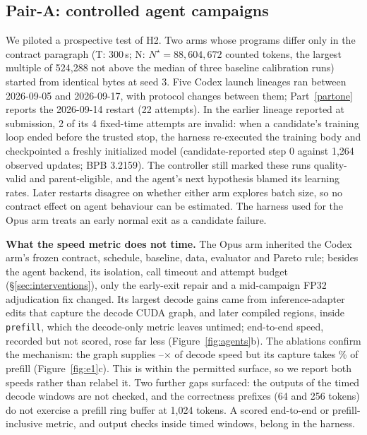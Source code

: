 \documentclass{article}
\newif\ifshowhumanmarkers \showhumanmarkersfalse
\newcommand{\humantag}[1]{{\color{humanframe}\sffamily\scriptsize\bfseries HUMAN AUTHOR MUST REWRITE/VERIFY [#1]}\ }
\newcommand{\humanauthor}[2][]{\ifshowhumanmarkers\begin{humanbox}\humantag{#1}#2\end{humanbox}\else #2\par\fi}
\begin{document}
\subsection{Pair-A: controlled agent campaigns}\label{sec:pilot}
\humanauthor[P2-15]{We piloted a prospective test of H2. Two arms whose programs differ only in the contract paragraph (T: 300\,s; N: $N^\star=88{,}604{,}672$ counted tokens, the largest multiple of 524,288 not above the median of three baseline calibration runs) started from identical bytes at seed 3. Five Codex launch lineages ran between 2026-09-05 and 2026-09-17, with protocol changes between them; Part~\ref{partone} reports the 2026-09-14 restart (22 attempts). In the earlier lineage reported at submission, 2 of its 4 fixed-time attempts are invalid: when a candidate's training loop ended before the trusted stop, the harness re-executed the training body and checkpointed a freshly initialized model (candidate-reported step 0 against 1,264 observed updates; BPB 3.2159). The controller still marked these runs quality-valid and parent-eligible, and the agent's next hypothesis blamed its learning rates. Later restarts disagree on whether either arm explores batch size, so no contract effect on agent behaviour can be estimated. The harness used for the Opus arm treats an early normal exit as a candidate failure.}

\humanauthor[P2-16]{\textbf{What the speed metric does not time.} The Opus arm inherited the Codex arm's frozen contract, schedule, baseline, data, evaluator and Pareto rule; besides the agent backend, its isolation, call timeout and attempt budget (\S\ref{sec:interventions}), only the early-exit repair and a mid-campaign FP32 adjudication fix changed. Its largest decode gains came from inference-adapter edits that capture the decode CUDA graph, and later compiled regions, inside \texttt{prefill}, which the decode-only metric leaves untimed; end-to-end speed, recorded but not scored, rose far less (Figure~\ref{fig:agents}b). The ablations confirm the mechanism: the graph supplies \CRIAGraphLo--\CRIAGraphHi$\times$ of decode speed but its capture takes \CRIACapture\% of prefill (Figure~\ref{fig:e1}c). This is within the permitted surface, so we report both speeds rather than relabel it. Two further gaps surfaced: the outputs of the timed decode windows are not checked, and the correctness prefixes (64 and 256 tokens) do not exercise a prefill ring buffer at 1{,}024 tokens. A scored end-to-end or prefill-inclusive metric, and output checks inside timed windows, belong in the harness.}
\label{parttwoend}
\end{document}
